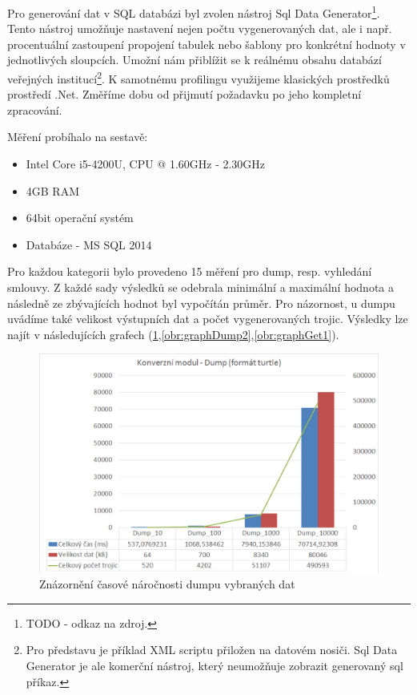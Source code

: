 Pro generování dat v SQL databázi byl zvolen nástroj Sql Data Generator\footnote{TODO - odkaz na zdroj.}. Tento nástroj umožňuje nastavení nejen počtu vygenerovaných dat, ale i např. procentuální zastoupení propojení tabulek nebo šablony pro konkrétní hodnoty v jednotlivých sloupcích. Umožní nám přiblížit se k reálnému obsahu databází veřejných institucí\footnote{Pro představu je příklad XML scriptu přiložen na datovém nosiči. Sql Data Generator je ale komerční nástroj, který neumožňuje zobrazit generovaný sql příkaz.}. K samotnému profilingu využijeme klasických prostředků prostředí .Net. Změříme dobu od přijmutí požadavku po jeho kompletní zpracování.
\newpage

Měření probíhalo na sestavě:
\begin{itemize}
\item Intel Core i5-4200U, CPU @ 1.60GHz - 2.30GHz
\item 4GB RAM
\item 64bit operační systém
\item Databáze - MS SQL 2014
\end{itemize}

Pro každou kategorii bylo provedeno 15 měření pro dump, resp. vyhledání smlouvy. Z každé sady výsledků se odebrala minimální a maximální hodnota a následně ze zbývajících hodnot byl vypočítán průměr. Pro názornost, u dumpu uvádíme také velikost výstupních dat a počet vygenerovaných trojic. Výsledky lze najít v následujících grafech (\ref{obr:graphDump1},\ref{obr:graphDump2},\ref{obr:graphGet1}).

\begin{figure}[H]
\centerline{\includegraphics[width=\textwidth]{img/graphDump1.eps}}
\caption{Znázornění časové náročnosti dumpu vybraných dat}
\label{obr:graphDump1}
\end{figure}


